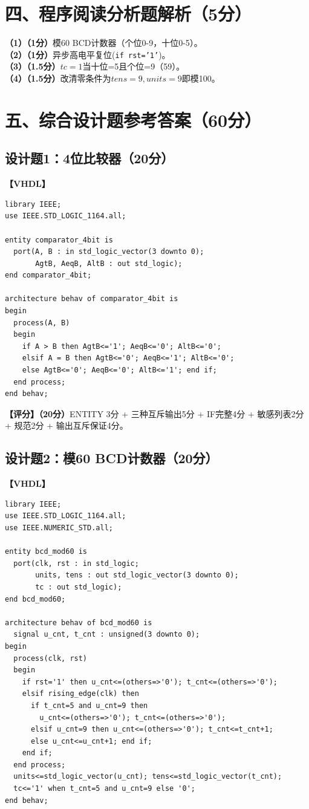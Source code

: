 \section{四、程序阅读分析题解析（5分）}

\textbf{（1）（1分）}模60 BCD计数器（个位0-9，十位0-5）。\\
\textbf{（2）（1分）}异步高电平复位(\texttt{if rst='1'})。\\
\textbf{（3）（1.5分）}$tc=1$当十位=5且个位=9（59）。\\
\textbf{（4）（1.5分）}改清零条件为$tens=9, units=9$即模100。

\section{五、综合设计题参考答案（60分）}

\subsection{设计题1：4位比较器（20分）}

\textbf{【VHDL】}
\begin{lstlisting}
library IEEE;
use IEEE.STD_LOGIC_1164.all;

entity comparator_4bit is
  port(A, B : in std_logic_vector(3 downto 0);
       AgtB, AeqB, AltB : out std_logic);
end comparator_4bit;

architecture behav of comparator_4bit is
begin
  process(A, B)
  begin
    if A > B then AgtB<='1'; AeqB<='0'; AltB<='0';
    elsif A = B then AgtB<='0'; AeqB<='1'; AltB<='0';
    else AgtB<='0'; AeqB<='0'; AltB<='1'; end if;
  end process;
end behav;
\end{lstlisting}

\textbf{【评分】（20分）}ENTITY 3分 + 三种互斥输出5分 + IF完整4分 + 敏感列表2分 + 规范2分 + 输出互斥保证4分。

\subsection{设计题2：模60 BCD计数器（20分）}

\textbf{【VHDL】}
\begin{lstlisting}
library IEEE;
use IEEE.STD_LOGIC_1164.all;
use IEEE.NUMERIC_STD.all;

entity bcd_mod60 is
  port(clk, rst : in std_logic;
       units, tens : out std_logic_vector(3 downto 0);
       tc : out std_logic);
end bcd_mod60;

architecture behav of bcd_mod60 is
  signal u_cnt, t_cnt : unsigned(3 downto 0);
begin
  process(clk, rst)
  begin
    if rst='1' then u_cnt<=(others=>'0'); t_cnt<=(others=>'0');
    elsif rising_edge(clk) then
      if t_cnt=5 and u_cnt=9 then
        u_cnt<=(others=>'0'); t_cnt<=(others=>'0');
      elsif u_cnt=9 then u_cnt<=(others=>'0'); t_cnt<=t_cnt+1;
      else u_cnt<=u_cnt+1; end if;
    end if;
  end process;
  units<=std_logic_vector(u_cnt); tens<=std_logic_vector(t_cnt);
  tc<='1' when t_cnt=5 and u_cnt=9 else '0';
end behav;
\end{lstlisting}

